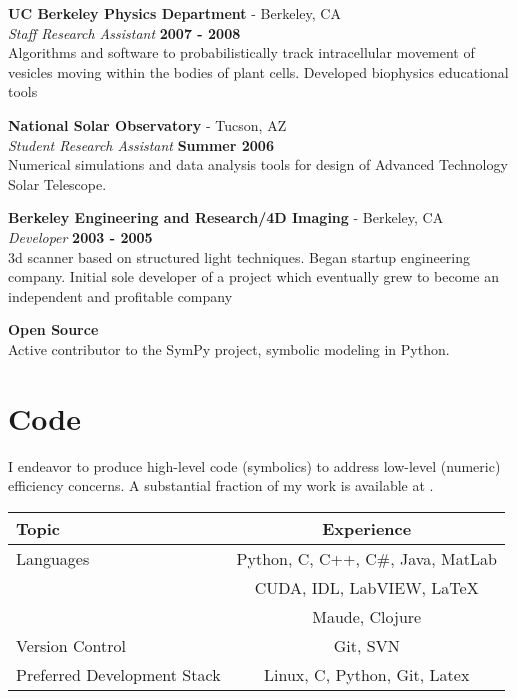 \documentclass[margin,line]{res}
\begin{document}
\begin{resume}
{\bf UC Berkeley Physics Department} - Berkeley, CA\\
{\em Staff Research Assistant} \hfill {\bf 2007 - 2008}\\
Algorithms and software to probabilistically track intracellular movement of vesicles moving within the bodies of plant cells. Developed biophysics educational tools

{\bf National Solar Observatory} - Tucson, AZ\\
{\em Student Research Assistant} \hfill {\bf Summer 2006}\\
Numerical simulations and data analysis tools for design of Advanced Technology Solar Telescope.

{\bf Berkeley Engineering and Research/4D Imaging} - Berkeley, CA\\
{\em Developer} \hfill {\bf 2003 - 2005}\\
3d scanner based on structured light techniques. Began startup engineering company. Initial sole developer of a project which eventually grew to become an independent and profitable company

{\bf Open Source }\\
Active contributor to the SymPy project, symbolic modeling in Python.

\section{\sc Code}

I endeavor to produce high-level code (symbolics) to address low-level (numeric) efficiency concerns. A substantial fraction of my work is available at .

\begin{center}
\begin{tabular}{|l | c| }
\hline
Topic  & Experience  \\
\hline
\hline
Languages & Python, C,  C++, C\#, Java, MatLab \\
&  CUDA, IDL, LabVIEW, LaTeX \\
&  Maude, Clojure \\
\hline
Version Control & Git, SVN \\
\hline
Preferred Development Stack & Linux, C, Python, Git, Latex\\
\hline
\end{tabular}
\end{center}

\end{resume}
\end{document}
